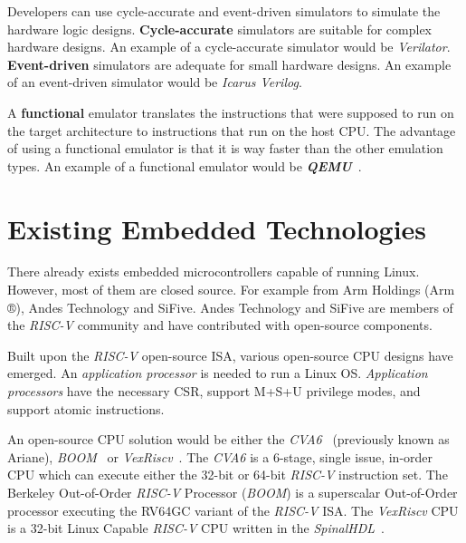 Developers can use cycle-accurate and event-driven simulators to simulate the hardware logic designs. \textbf{Cycle-accurate}  simulators are suitable for complex hardware designs. An example of a cycle-accurate simulator would be \textit{Verilator}. \textbf{Event-driven} simulators are adequate for small hardware designs. An example of an event-driven simulator would be \textit{Icarus Verilog}.

A \textbf{functional} emulator translates the instructions that were supposed to run on the target architecture to instructions that run on the host CPU. The advantage of using a functional emulator is that it is way faster than the other emulation types. An example of a functional emulator would be \textbf{\textit{QEMU}}~\cite{bellard2005qemu}.

\section{Existing Embedded Technologies}
\label{sec:existing_embedded_technologies}
There already exists embedded microcontrollers capable of running Linux. However, most of them are closed source. For example from Arm Holdings (Arm ®), Andes Technology and SiFive. Andes Technology and SiFive are members of the \textit{RISC-V} community and have contributed with open-source components. 

Built upon the \textit{RISC-V} open-source ISA, various open-source CPU designs have emerged. An \textit{application processor} is needed to run a Linux OS. \textit{Application processors} have the necessary CSR, support M+S+U privilege modes, and support atomic instructions. 

An open-source CPU solution would be either the \textit{CVA6}~\cite{zaruba2019cost} (previously known as Ariane), \textit{BOOM}~\cite{zhaosonicboom} or \textit{VexRiscv}~\cite{vexriscv}. The \textit{CVA6} is a 6-stage, single issue, in-order CPU which can execute either the 32-bit or 64-bit \textit{RISC-V} instruction set. The Berkeley Out-of-Order \textit{RISC-V} Processor (\textit{BOOM}) is a superscalar Out-of-Order processor executing the RV64GC variant of the \textit{RISC-V} ISA. The \textit{VexRiscv} CPU is a 32-bit Linux Capable \textit{RISC-V} CPU written in the \textit{SpinalHDL}~\cite{papon2017spinalhdl}.